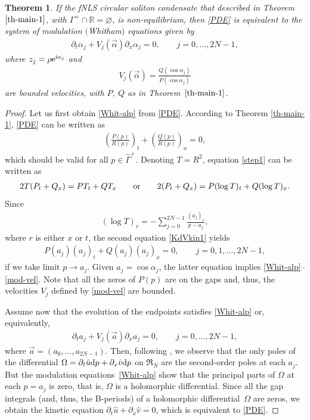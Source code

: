 \documentclass[10pt,a4paper]{amsart}
\numberwithin{equation}{section}
\newtheorem{Theorem}{Theorem}[section]
\def\ra{\rightarrow}
\newcommand{\G}{\Gamma}
\def\R{{\mathbb R}}
\def\a{\alpha}
\def\G{\Gamma}
\begin{document}
\begin{Theorem}\label{th-main-2}
If the fNLS circular soliton condensate that described in Theorem $\ref{th-main-1}$, with ${\G^+\cap\R=\varnothing}$, is non-equilibrium, then \eqref{PDE} is equivalent to the system of modulation $($Whitham$)$ equations
given by
\begin{gather}\label{Whit-alp}
\partial_t\a_j+V_j(\vec\a)\partial_x\a_j=0, \qquad j=0,\dots, 2N-1,
\end{gather}
where $z_j=\rho {\rm e}^{{\rm i}\a_j}$ and
\begin{gather}\label{mod-vel}
V_j(\vec\a)=\frac{Q(\cos\a_j)}{P(\cos\a_j)}
\end{gather}
are bounded velocities, with $P$, $Q$ as in Theorem~$\ref{th-main-1}$.
\end{Theorem}



\begin{proof}
Let us first obtain \eqref{Whit-alp}	 from \eqref{PDE}. According to Theorem \ref{th-main-1}, \eqref{PDE} can be written as
\begin{gather}\label{step1}
\left(\frac {P(p)}{R(p)}\right)_t+\left(\frac {Q(p)}{R(p)}\right)_x=0,
\end{gather}
which should be valid for all $p\in\hat\G^+$. Denoting $T=R^2$,
equation \eqref{step1} can be written as
\begin{gather}\label{KdVkin1}
2T(P_t+Q_x)=PT_t+QT_x \qquad {\rm or} \qquad 2(P_t+Q_x)=P(\log T)_t+Q(\log T)_x.
\end{gather}
Since
\begin{gather*}
(\log T)_r=-\sum_{j=0}^{2N-1}\frac{(a_j)_r}{p-a_j},
\end{gather*}
where $r$ is either $x$ or $t$,
the second equation \eqref{KdVkin1} yields
\begin{gather*}%
P(a_j)(a_j)_t+Q(a_j)(a_j)_x=0, \qquad j=0,1,\dots,2N-1,
\end{gather*}
if we take limit $p\ra a_j$. Given $a_j=\cos \a_j$, the latter equation implies \eqref{Whit-alp}--\eqref{mod-vel}. Note that all the zeros of $P(p)$ are on the gaps and, thus, the velocities $V_j$ defined by \eqref{mod-vel} are bounded.

Assume now that the evolution of the endpoints satisfies
\eqref{Whit-alp} or, equivalently,
\begin{gather*}%
\partial_t a_j+V_j(\vec a)\partial_x a_j=0, \qquad j=0,\dots, 2N-1,
\end{gather*}
where $\vec a=(a_0,\dots, a_{2N-1})$.
Then, following \cite{FFM}, we observe that the only poles of the differential $\Omega=\partial_t\hat u{\rm d}p+\partial_x\hat v{\rm d}p$ on $\mathfrak R_N$ are the second-order poles at each $a_j$. But the modulation equations~\eqref{Whit-alp} show that the principal parts of $\Omega$ at each $p=a_j$ is zero, that is, $\Omega$ is a holomorphic differential.
Since all the gap integrals (and, thus, the B-periods) of a holomorphic differential~$\Omega$ are zeros, we obtain the kinetic equation $\partial_t\hat u+\partial_x\hat v=0$, which is equivalent to \eqref{PDE}.
\end{proof}
\end{document}
